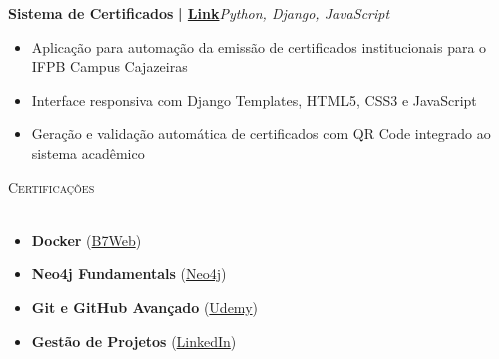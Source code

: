 \documentclass[a4paper]{article}
\newcommand{\lineunder}{
    \vspace*{-8pt} \\
    \hspace*{-18pt} \hrulefill \\
}
\newcommand{\header}[1]{
    {\hspace*{-18pt}\vspace*{6pt} \textsc{#1}}
    \vspace*{-6pt} \lineunder
}
\begin{document}
{\textbf{Sistema de Certificados}}\textbf{ | \href{https://github.com/bodescorp/Cext-final-}{Link}}\hfill{\sl Python, Django, JavaScript}\\
\vspace{-3mm}
\begin{itemize}[leftmargin=*] \itemsep -2pt
    \item Aplicação para automação da emissão de certificados institucionais para o IFPB Campus Cajazeiras
    \item Interface responsiva com Django Templates, HTML5, CSS3 e JavaScript
    \item Geração e validação automática de certificados com QR Code integrado ao sistema acadêmico
\end{itemize}
\vspace*{2mm}

%
%
\header{Certificações}
\vspace{1mm}
\begin{itemize}[leftmargin=*] \itemsep -2pt    
    \item \textbf{Docker} (\href{https://drive.google.com/drive/folders/1YKThgvnT5h1bA_Hb0uDiIf7p8Qiph-NC}{B7Web})
    \item \textbf{Neo4j Fundamentals} (\href{https://graphacademy.neo4j.com/c/9d25b259-5995-4053-8475-7b2bf61f163e/}{Neo4j})
    \item \textbf{Git e GitHub Avançado} (\href{https://www.udemy.com/certificate/UC-db57cce7-1471-47ff-9828-0e3a4d7da628/}{Udemy})
    \item \textbf{Gestão de Projetos} (\href{https://www.linkedin.com/learning/certificates/0fc1a744c87dc72f53e8c694fd58809808a183327167377cb224c1ac43e732b6}{LinkedIn})
\end{itemize}
\end{document}
